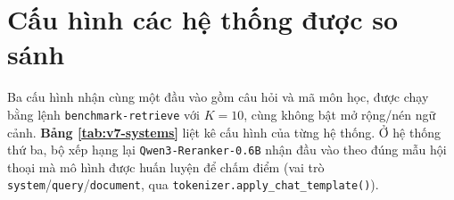 
\section{Cấu hình các hệ thống được so sánh}\label{sec:cau-hinh}

Ba cấu hình nhận cùng một đầu vào gồm câu hỏi và mã môn học, được chạy bằng lệnh \texttt{benchmark-retrieve} với $K = 10$, cùng không bật mở rộng/nén ngữ cảnh. \textbf{Bảng \ref{tab:v7-systems}} liệt kê cấu hình của từng hệ thống. Ở hệ thống thứ ba, bộ xếp hạng lại \texttt{Qwen3-Reranker-0.6B} nhận đầu vào theo đúng mẫu hội thoại mà mô hình được huấn luyện để chấm điểm (vai trò \texttt{system}/\texttt{query}/\texttt{document}, qua \texttt{tokenizer.apply\_chat\_template()}).

